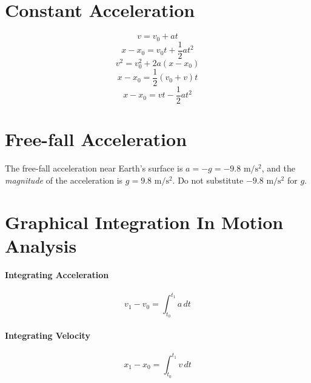 \documentclass{article}
\begin{document}
    \section{Constant Acceleration}

        \begin{equation}
            v = v_0 + at
        \end{equation}
        \begin{equation}
            x - x_0 = v_0t + \frac{1}{2} at^2
        \end{equation}
        \begin{equation}
            v^2 = v_0^2 + 2a \left( x - x_0 \right)
        \end{equation}
        \begin{equation}
            x - x_0 = \frac{1}{2} \left( v_0 + v  \right) t
        \end{equation}
        \begin{equation}
            x - x_0 = vt - \frac{1}{2} at^2
        \end{equation}
    
    \section{Free-fall Acceleration}

        The free-fall acceleration near Earth's surface is $a = -g = -9.8 \text{ m}/\text{s}^2$, and the \textit{magnitude} of the acceleration is $g = 9.8 \text{ m}/\text{s}^2$. Do not substitute $-9.8 \text{ m}/\text{s}^2$ for $g$.
    
    \section{Graphical Integration In Motion Analysis}

        \paragraph{Integrating Acceleration}
        \begin{equation}
            v_1 - v_0 = \int_{t_0}^{t_1} a \, dt
        \end{equation}

        \paragraph{Integrating Velocity}
        \begin{equation}
            x_1 - x_0 = \int_{t_0}^{t_1} v \, dt
        \end{equation}
\end{document}

